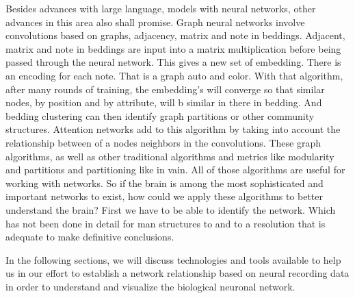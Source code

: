 \documentclass[11pt]{article}
\begin{document}
 Besides advances with large language, models with neural networks, other advances in this area also shall promise. Graph neural networks involve convolutions based on graphs, adjacency, matrix and note in beddings. Adjacent, matrix and note in beddings are input into a matrix multiplication before being passed through the neural network. This gives a new set of embedding. There is an encoding for each note. That is a graph auto and color. With that algorithm, after many rounds of training, the embedding's will converge so that similar nodes, by position and by attribute, will b similar in there in bedding. And bedding clustering can then identify graph partitions or other community structures. Attention networks add to this algorithm by taking into account the relationship between of a nodes neighbors in the convolutions. These graph algorithms, as well as other traditional algorithms and metrics like modularity and partitions and partitioning like in vain. All of those algorithms are useful for working with networks. So if the brain is among the most sophisticated and important networks to exist, how could we apply these algorithms to better understand the brain? First we have to be able to identify the network. Which has not been done in detail for man structures to and to a resolution that is adequate to make definitive conclusions.

In the following sections, we will discuss technologies and tools available to help us in our effort to establish a network relationship based on neural recording data in order to understand and visualize the biological neuronal network.
\end{document}
